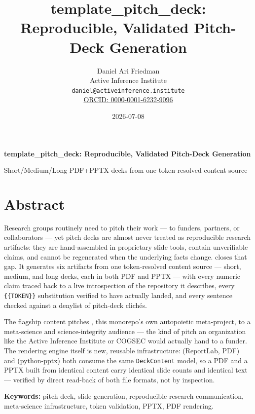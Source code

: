 \documentclass[
]{article}
\author{}
\date{}
\title{template\_pitch\_deck: Reproducible, Validated Pitch-Deck Generation}
\author{Daniel Ari Friedman\\\footnotesize{Active Inference Institute}\\\footnotesize{\texttt{daniel@activeinference.institute}}\\\footnotesize{\href{https://orcid.org/0000-0001-6232-9096}{ORCID: 0000-0001-6232-9096}}}
\date{2026-07-08}
\begin{document}
\begin{titlepage}
\centering
\vspace*{2cm}
{\LARGE\bfseries template\_pitch\_deck: Reproducible, Validated Pitch-Deck Generation\par}
\vspace{0.75em}
{\large Short/Medium/Long PDF+PPTX decks from one token-resolved content source\par}
\vfill
\makeatletter
{\@author\par}
\vspace{1em}
{\@date\par}
\makeatother
\vfill
\end{titlepage}
\thispagestyle{empty}
\tableofcontents
\newpage


\section{Abstract}\label{sec:abstract}

Research groups routinely need to pitch their work --- to funders,
partners, or collaborators --- yet pitch decks are almost never treated
as reproducible research artifacts: they are hand-assembled in
proprietary slide tools, contain unverifiable claims, and cannot be
regenerated when the underlying facts change.
 closes that gap. It generates six
artifacts from one token-resolved content source --- short, medium, and
long decks, each in both PDF and PPTX --- with every numeric claim
traced back to a live introspection of the repository it describes,
every \texttt{\{\{TOKEN\}\}} substitution verified to have actually
landed, and every sentence checked against a denylist of pitch-deck
clichés.

The flagship content pitches
\href{../../template_template/}{}, this
monorepo's own autopoietic meta-project, to a meta-science and
science-integrity audience --- the kind of pitch an organization like
the Active Inference Institute or COGSEC would actually hand to a
funder. The rendering engine itself is new, reusable infrastructure:
 (ReportLab, PDF) and
 (python-pptx) both
consume the same \texttt{DeckContent} model, so a PDF and a PPTX built
from identical content carry identical slide counts and identical text
--- verified by direct read-back of both file formats, not by
inspection.

\textbf{Keywords:} pitch deck, slide generation, reproducible research
communication, meta-science infrastructure, token validation, PPTX, PDF
rendering.
\end{document}
